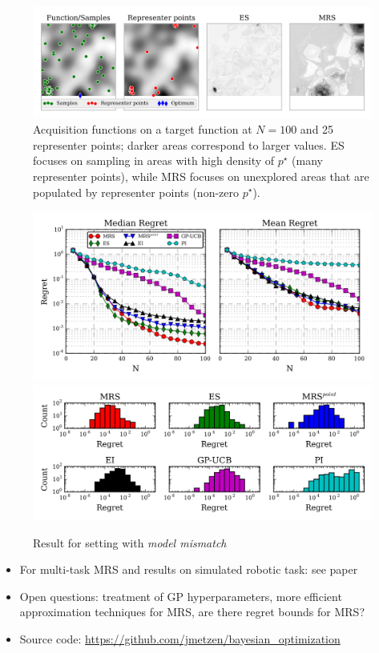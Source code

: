 \begin{block}{}
\begin{center}
\begin{figure}
\centering
\includegraphics[width=.8\textwidth]{../pics/es_analysis}
\caption{Acquisition functions on a target function at $N=100$ and 25 representer points; darker areas correspond to larger values. ES focuses on sampling in areas with high density of $p^\star$ (many representer points), while MRS focuses on unexplored areas that are populated by representer points (non-zero $p^\star$).
}
\label{fig:es_analysis}
\end{figure}


\begin{figure}
\centering
\includegraphics[width=.8\textwidth]{../pics/empirical_comparison_mm} \\
\includegraphics[width=.8\textwidth]{../pics/hist_mm}
\caption{Result for setting with \emph{model mismatch}}
\label{fig:empirical_comparison_mm}
\end{figure}

\end{center}
\end{block}

\begin{block}{}
\begin{itemize}
 \item For multi-task MRS and results on simulated robotic task: see paper
 \item Open questions: treatment of GP hyperparameters, more efficient approximation techniques for MRS, are there regret bounds for MRS?
 \item Source code: \url{https://github.com/jmetzen/bayesian_optimization}
\end{itemize}
\end{block}

